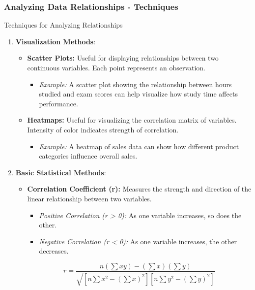 \documentclass[aspectratio=169]{beamer}
\begin{document}
\begin{frame}[fragile]
    \frametitle{Analyzing Data Relationships - Techniques}
    \begin{block}{Techniques for Analyzing Relationships}
        \begin{enumerate}
            \item \textbf{Visualization Methods}:
                \begin{itemize}
                    \item \textbf{Scatter Plots:} Useful for displaying relationships between two continuous variables.
                          Each point represents an observation.
                          \begin{itemize}
                              \item \textit{Example:} A scatter plot showing the relationship between hours studied and exam scores can help visualize how study time affects performance.
                          \end{itemize}
                    \item \textbf{Heatmaps:} Useful for visualizing the correlation matrix of variables.
                          Intensity of color indicates strength of correlation.
                          \begin{itemize}
                              \item \textit{Example:} A heatmap of sales data can show how different product categories influence overall sales.
                          \end{itemize}
                \end{itemize}
            \item \textbf{Basic Statistical Methods}:
                \begin{itemize}
                    \item \textbf{Correlation Coefficient (r):} Measures the strength and direction of the linear relationship between two variables.
                          \begin{itemize}
                              \item \textit{Positive Correlation (r > 0):} As one variable increases, so does the other.
                              \item \textit{Negative Correlation (r < 0):} As one variable increases, the other decreases.
                          \end{itemize}
                          \begin{equation}
                              r = \frac{n(\sum xy) - (\sum x)(\sum y)}{\sqrt{[n\sum x^2 - (\sum x)^2][n\sum y^2 - (\sum y)^2]}}
                          \end{equation}
                \end{itemize}
        \end{enumerate}
    \end{block}
\end{frame}
\end{document}
